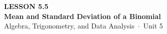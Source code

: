 \documentclass[aspectratio=169, 11pt]{beamer}
\begin{document}
{
\begin{frame}[plain]
  \vspace{2.8cm}\hspace{0.55cm}%
  \begin{minipage}{0.9\textwidth}
    {\color{goldacc}\bfseries\small LESSON 5.5}\\[0.5cm]
    {\color{white}\bfseries\LARGE Mean and Standard Deviation of a Binomial}\\[1.2cm]
    {\color{mistmid}\small Algebra, Trigonometry, and Data Analysis~$\cdot$~Unit 5}
  \end{minipage}
\end{frame}
}

\begin{frame}[t, plain]
\end{frame}
\end{document}
